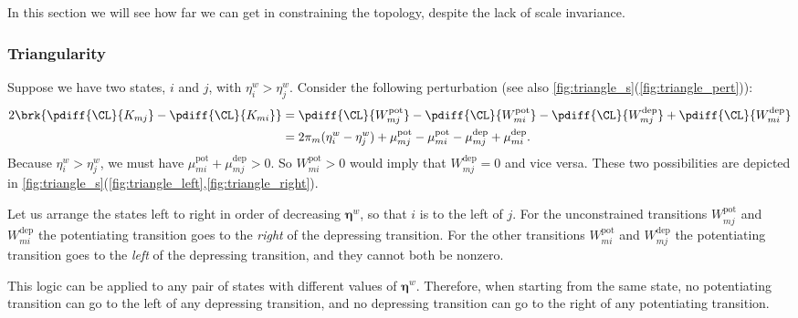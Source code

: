 \documentclass[12pt]{article}
\newcommand{\eqm}{\pi}
\newcommand{\etwm}{\eta^w}
\newcommand{\etw}{\boldsymbol{\eta}^w}
\newcommand{\Wm}{W}
\newcommand{\encm}{K}
\newcommand{\kktm}{\mu}
\newcommand{\pot}{^{\text{pot}}}
\newcommand{\dep}{^{\text{dep}}}
\begin{document}
In this section we will see how far we can get in constraining the topology, 
despite the lack of scale invariance.



\subsubsection{Triangularity}\label{sec:parttriangular}

Suppose we have two states, \(i\) and \(j\), with \( \etwm_i > \etwm_j \).
Consider the following perturbation (see also \cref{fig:triangle_s}(\ref{fig:triangle_pert})):
%
\begin{equation}\label{eq:pertKupdn}
\begin{aligned}
  2 \brk{\pdiff{\CL}{\encm_{mj}} - \pdiff{\CL}{\encm_{mi}}}
  &= \pdiff{\CL}{\Wm\pot_{mj}} - \pdiff{\CL}{\Wm\pot_{mi}} -
  \pdiff{\CL}{\Wm\dep_{mj}} + \pdiff{\CL}{\Wm\dep_{mi}} \\ 
    &= 2 \eqm_m (\etwm_i - \etwm_j) 
    + \kktm\pot_{mj} - \kktm\pot_{mi} - \kktm\dep_{mj} + \kktm\dep_{mi}.
\end{aligned}
\end{equation}
%
Because \( \etwm_i > \etwm_j \), we must have \( \kktm\pot_{mi} + \kktm\dep_{mj} > 0 \).
So \( \Wm\pot_{mi} > 0 \) would imply that \( \Wm\dep_{mj} = 0 \) and vice versa.
These two possibilities are depicted in \cref{fig:triangle_s}(\ref{fig:triangle_left},\ref{fig:triangle_right}).

Let us arrange the states left to right in order of decreasing \(\etw\), so that \(i\) is to the left of \(j\).
For the unconstrained transitions \( \Wm\pot_{mj} \) and \( \Wm\dep_{mi} \) the potentiating transition goes to the \emph{right} of the depressing transition.
For the other transitions \( \Wm\pot_{mi} \) and \( \Wm\dep_{mj} \) the potentiating transition goes to the \emph{left} of the depressing transition, and they cannot both be nonzero.

This logic can be applied to any pair of states with different values of \(\etw\).
Therefore, when starting from the same state, no potentiating transition can go to the left of any depressing transition, and no depressing transition can go to the right of any potentiating transition.
\end{document}
